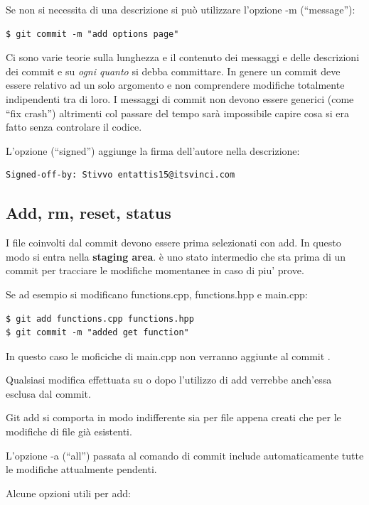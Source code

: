 \documentclass{article}
\begin{document}
Se non si necessita di una descrizione si può utilizzare l'opzione -m
(``message''):

\begin{verbatim}
$ git commit -m "add options page"
\end{verbatim}

Ci sono varie teorie  sulla lunghezza e il contenuto dei messaggi e delle
descrizioni dei commit e su \textit{ogni quanto} si debba committare. In genere un
commit deve essere relativo ad un solo argomento e non comprendere modifiche
totalmente indipendenti tra di loro. I messaggi di commit non devono essere
generici (come ``fix crash'') altrimenti col passare del tempo sarà impossibile
capire cosa si era fatto senza controlare il codice.

L'opzione  (``signed'') aggiunge la firma dell'autore nella descrizione:

\begin{verbatim}
Signed-off-by: Stivvo entattis15@itsvinci.com
\end{verbatim}

\subsection{Add, rm, reset, status}
I file coinvolti dal commit devono essere prima selezionati con add. In questo
modo si entra nella \textbf{staging area}. è uno stato intermedio che sta prima di
un commit per tracciare le modifiche momentanee in caso di piu' prove.

Se ad esempio si modificano functions.cpp, functions.hpp e main.cpp:

\begin{verbatim}
$ git add functions.cpp functions.hpp
$ git commit -m "added get function"
\end{verbatim}

In questo caso le moficiche di main.cpp non verranno aggiunte al commit .

Qualsiasi modifica effettuata su  o  dopo l'utilizzo
di add verrebbe anch'essa esclusa dal commit.

Git add si comporta in modo indifferente sia per file appena creati che per le
modifiche di file già esistenti.

L'opzione -a (``all'') passata al comando di commit include automaticamente tutte
le modifiche attualmente pendenti.

Alcune opzioni utili per add:
\end{document}
